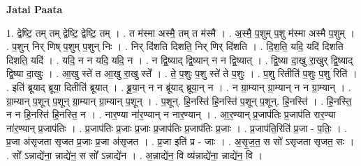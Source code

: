 \documentclass[17pt]{extarticle}
\begin{document}
\textbf{Jatai Paata} \newline

1. द्वेष्टि॒ तम् तम् द्वेष्टि॒ द्वेष्टि॒ तम् । . त म॑स्मा अस्मै॒ तम् त म॑स्मै । . अ॒स्मै॒ प॒शुम् प॒शु म॑स्मा अस्मै प॒शुम् । . प॒शुन् निर् णिष् प॒शुम् प॒शुन् निः । . निर् दि॑शति दिशति॒ निर् णिर् दि॑शति । . दि॒श॒ति॒ यदि॒ यदि॑ दिशति दिशति॒ यदि॑ । . यदि॒ न न यदि॒ यदि॒ न । . न द्वि॒ष्याद् द्वि॒ष्यान् न न द्वि॒ष्यात् । . द्वि॒ष्या दा॒खु रा॒खुर् द्वि॒ष्याद् द्वि॒ष्या दा॒खुः । . आ॒खु स्ते॑ त आ॒खु रा॒खु स्ते᳚ । . ते॒ प॒शुः प॒शु स्ते॑ ते प॒शुः । . प॒शु रितीति॑ प॒शुः प॒शु रिति॑ । . इति॑ ब्रूयाद् ब्रूया॒ दितीति॑ ब्रूयात् । . ब्रू॒या॒न् न न ब्रू॑याद् ब्रूया॒न् न । . न ग्रा॒म्यान् ग्रा॒म्यान् न न ग्रा॒म्यान् । . ग्रा॒म्यान् प॒शून् प॒शून् ग्रा॒म्यान् ग्रा॒म्यान् प॒शून् । . प॒शून्. हि॒नस्ति॑ हि॒नस्ति॑ प॒शून् प॒शून्. हि॒नस्ति॑ । . हि॒नस्ति॒ न न हि॒नस्ति॑ हि॒नस्ति॒ न । . नार॒ण्या ना॑र॒ण्यान् न नार॒ण्यान् । . आ॒र॒ण्यान् प्र॒जाप॑तिः प्र॒जाप॑ति रार॒ण्या ना॑र॒ण्यान् प्र॒जाप॑तिः । . प्र॒जाप॑तिः प्र॒जाः प्र॒जाः प्र॒जाप॑तिः प्र॒जाप॑तिः प्र॒जाः । . प्र॒जाप॑ति॒रिति॑ प्र॒जा - प॒तिः॒ । . प्र॒जा अ॑सृजता सृजत प्र॒जाः प्र॒जा अ॑सृजत । . प्र॒जा इति॑ प्र - जाः । . अ॒सृ॒ज॒त॒ स सो॑ ऽसृजता सृजत॒ सः । . सो᳚ ऽन्नाद्ये॑ना॒ न्नाद्ये॑न॒ स सो᳚ ऽन्नाद्ये॑न । . अ॒न्नाद्ये॑न॒ वि व्य॑न्नाद्ये॑ना॒ न्नाद्ये॑न॒ वि । \newline
\end{document}
